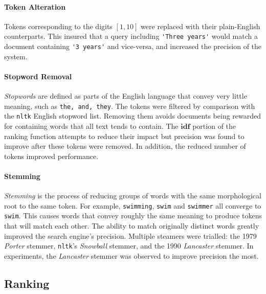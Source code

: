 \documentclass[11pt, a4paper, twocolumn]{article}   	%
\begin{document}
\paragraph{Token Alteration}
Tokens corresponding to the digits $[1, 10]$ were replaced with their plain-English counterparts. This insured that a query including \verb|'Three years'| would match a document containing \verb|'3 years'| and vice-versa, and increased the precision of the system.

\paragraph{Stopword Removal}
\emph{Stopwords} are defined as parts of the English language that convey very little meaning, such as \verb|the, and, they|.
The tokens were filtered by comparison with the \verb|nltk| English stopword list. Removing them avoids documents being rewarded for containing words that all text tends to contain. The $\mathbf{idf}$ portion of the ranking function attempts to reduce their impact but precision was found to improve after these tokens were removed. In addition, the reduced number of tokens improved performance.

\paragraph{Stemming}
\emph{Stemming} is the process of reducing groups of words with the same morphological root to the same token. For example, \verb|swimming|, \verb|swim| and \verb|swimmer| all converge to \verb|swim|. This causes words that convey roughly the same meaning to produce tokens that will match each other. The ability to match originally distinct words greatly improved the search engine's precision. Multiple steamers were trialled: the 1979 \emph{Porter} stemmer, \verb|nltk|'s \emph{Snowball} stemmer, and the 1990 \emph{Lancaster} stemmer. In experiments, the \emph{Lancaster} stemmer was observed to improve precision the most.

\subsection{Ranking}
\end{document}
